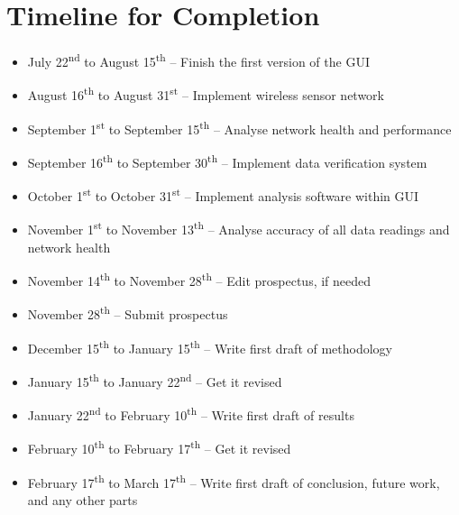 \chapter{Timeline for Completion}
\begin{itemize}
\item July 22\textsuperscript{nd} to August 15\textsuperscript{th} -- Finish the first version of the GUI

\item August 16\textsuperscript{th} to August 31\textsuperscript{st} -- Implement wireless sensor network

\item September 1\textsuperscript{st} to September 15\textsuperscript{th} -- Analyse network health and performance

\item September 16\textsuperscript{th} to September 30\textsuperscript{th} -- Implement data verification system

\item October 1\textsuperscript{st} to October 31\textsuperscript{st} -- Implement analysis software within GUI

\item November 1\textsuperscript{st} to November 13\textsuperscript{th} -- Analyse accuracy of all data readings and network health

\item November 14\textsuperscript{th} to November 28\textsuperscript{th} -- Edit prospectus, if needed

\item November 28\textsuperscript{th} -- Submit prospectus

\item December 15\textsuperscript{th} to January 15\textsuperscript{th} -- Write first draft of methodology

\item January 15\textsuperscript{th} to January 22\textsuperscript{nd} -- Get it revised

\item January 22\textsuperscript{nd} to February 10\textsuperscript{th} -- Write first draft of results

\item February 10\textsuperscript{th} to February 17\textsuperscript{th} -- Get it revised

\item February 17\textsuperscript{th} to March 17\textsuperscript{th} -- Write first draft of conclusion, future work, and any other parts


\end{itemize}
